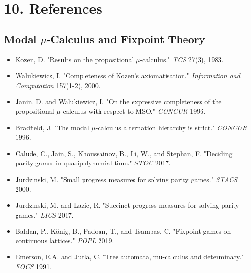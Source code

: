 \documentclass[11pt]{article}
\begin{document}
\section{10. References}
\label{sec:org9466ad8}

\subsection{Modal \(\mu\)-Calculus and Fixpoint Theory}
\label{sec:org3a1d80d}
\begin{itemize}
\item Kozen, D. "Results on the propositional \(\mu\)-calculus." \emph{TCS} 27(3), 1983.
\item Walukiewicz, I. "Completeness of Kozen's axiomatisation." \emph{Information and Computation} 157(1-2), 2000.
\item Janin, D. and Walukiewicz, I. "On the expressive completeness of the propositional \(\mu\)-calculus with respect to MSO." \emph{CONCUR} 1996.
\item Bradfield, J. "The modal \(\mu\)-calculus alternation hierarchy is strict." \emph{CONCUR} 1996.
\item Calude, C., Jain, S., Khoussainov, B., Li, W., and Stephan, F. "Deciding parity games in quasipolynomial time." \emph{STOC} 2017.
\item Jurdzinski, M. "Small progress measures for solving parity games." \emph{STACS} 2000.
\item Jurdzinski, M. and Lazic, R. "Succinct progress measures for solving parity games." \emph{LICS} 2017.
\item Baldan, P., König, B., Padoan, T., and Tsampas, C. "Fixpoint games on continuous lattices." \emph{POPL} 2019.
\item Emerson, E.A. and Jutla, C. "Tree automata, mu-calculus and determinacy." \emph{FOCS} 1991.
\end{itemize}
\end{document}
